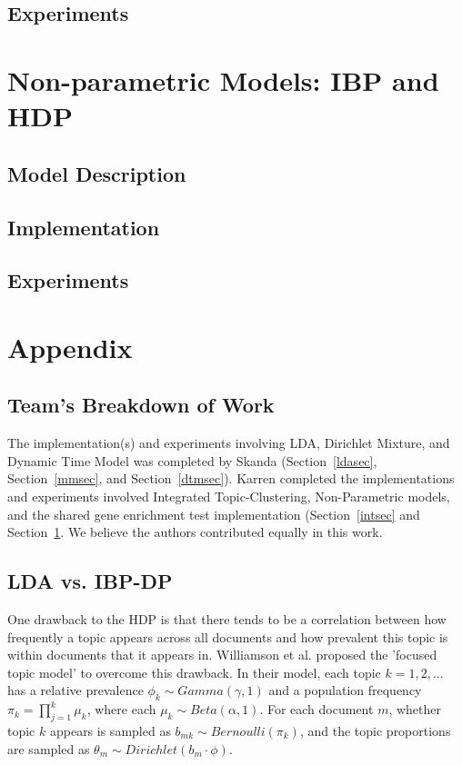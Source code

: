 \documentclass{article}
\begin{document}
\subsection{Experiments} 



\section{Non-parametric Models: IBP and HDP} 
\label{nonparametricsec}
\subsection{Model Description} 
\subsection{Implementation} 
\subsection{Experiments} 







\section{Appendix} 

\subsection{Team's Breakdown of Work}
The implementation(s) and experiments involving LDA, Dirichlet Mixture, and Dynamic Time Model was completed by Skanda (Section~\ref{ldasec}, Section~\ref{mmsec}, and Section~\ref{dtmsec}). Karren completed the implementations and experiments involved Integrated Topic-Clustering, Non-Parametric models, and the shared gene enrichment test implementation (Section~\ref{intsec} and Section~\ref{nonparametricsec}. We believe the authors contributed equally in this work.

\subsection{LDA vs. IBP-DP}
One drawback to the HDP is that there tends to be a correlation between how frequently a topic appears across all documents and how prevalent this topic is within documents that it appears in. Williamson et al. \cite{IBP} proposed the 'focused topic model' to overcome this drawback. In their model, each topic $k = 1,2,...$ has a relative prevalence $\phi_k \sim Gamma(\gamma, 1)$ and a population frequency $\pi_k = \prod^k_{j=1} \mu_k$, where each $\mu_k \sim Beta(\alpha, 1) $. For each document $m$, whether topic $k$ appears is sampled as $b_{mk} \sim Bernoulli(\pi_k)$, and the topic proportions are sampled as $\theta_m \sim Dirichlet(b_m \cdot \phi)$. \\
\end{document}

